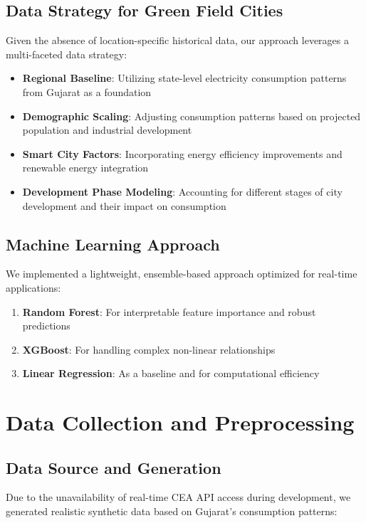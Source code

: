 \documentclass[12pt,a4paper]{article}
\begin{document}
\subsection{Data Strategy for Green Field Cities}
Given the absence of location-specific historical data, our approach leverages a multi-faceted data strategy:

\begin{itemize}
    \item \textbf{Regional Baseline}: Utilizing state-level electricity consumption patterns from Gujarat as a foundation
    \item \textbf{Demographic Scaling}: Adjusting consumption patterns based on projected population and industrial development
    \item \textbf{Smart City Factors}: Incorporating energy efficiency improvements and renewable energy integration
    \item \textbf{Development Phase Modeling}: Accounting for different stages of city development and their impact on consumption
\end{itemize}

\subsection{Machine Learning Approach}
We implemented a lightweight, ensemble-based approach optimized for real-time applications:

\begin{enumerate}
    \item \textbf{Random Forest}: For interpretable feature importance and robust predictions
    \item \textbf{XGBoost}: For handling complex non-linear relationships
    \item \textbf{Linear Regression}: As a baseline and for computational efficiency
\end{enumerate}

\section{Data Collection and Preprocessing}

\subsection{Data Source and Generation}
Due to the unavailability of real-time CEA API access during development, we generated realistic synthetic data based on Gujarat's consumption patterns:
\end{document}

